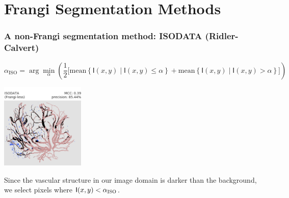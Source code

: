 \documentclass[9pt]{beamer}
\newcommand{\alphaiso}{\alpha_{{\tiny\textsc{ISO}}}}
\newcommand{\img}{\mathsf{I}} %
\begin{document}
\section{Frangi Segmentation Methods}


\begin{frame}
\frametitle{A non-Frangi segmentation method: ISODATA (Ridler-Calvert)}
\begin{equation*} \label{eq:ISODATA}
\alpha_{\textrm{ISO}} = \arg\min_{\alpha} \left( \frac{1}{2} \Big[
\textrm{mean}\left\{ \img(x,y) \;|\; \img(x,y) \le \alpha \right\} 
+
\textrm{mean}\left\{ \img(x,y) \;|\; \img(x,y) >   \alpha \right\}
\Big]
\right)
\end{equation*}

\includegraphics[width=0.3\textwidth]{isodata_example}

Since the vascular structure in our image domain is darker than the background, we select pixels
where $\img(x,y) < \alphaiso$.
\end{frame}
\end{document}
